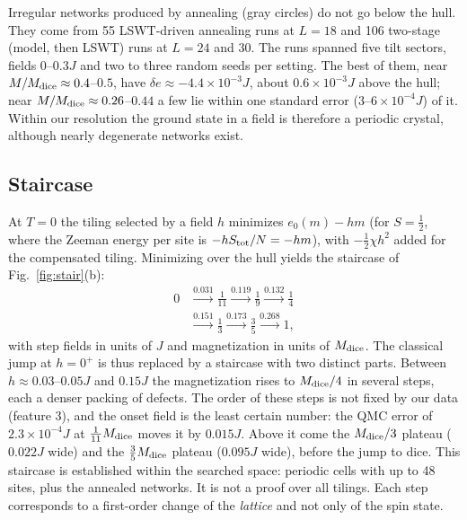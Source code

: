 \documentclass[prb,twocolumn,amsmath,amssymb,floatfix]{revtex4-2}
\newcommand{\Md}{M_{\rm dice}}
\begin{document}
Irregular networks produced by annealing (gray circles) do not go below the hull. They come from 55 LSWT-driven annealing runs at $L=18$ and 106 two-stage (model, then LSWT) runs at $L=24$ and $30$. The runs spanned five tilt sectors, fields $0$--$0.3J$ and two to three random seeds per setting. The best of them, near $M/\Md\approx0.4$--$0.5$, have $\delta e\approx-4.4\times10^{-3}J$, about $0.6\times10^{-3}J$ above the hull; near $M/\Md\approx0.26$--$0.44$ a few lie within one standard error ($3$--$6\times10^{-4}J$) of it. Within our resolution the ground state in a field is therefore a periodic crystal, although nearly degenerate networks exist.

\subsection{Staircase}

At $T=0$ the tiling selected by a field $h$ minimizes $e_0(m)-hm$ (for $S=\frac12$, where the Zeeman energy per site is $-hS_{\rm tot}/N=-hm$), with $-\frac12\chi h^2$ added for the compensated tiling. Minimizing over the hull yields the staircase of Fig.~\ref{fig:stair}(b):
\begin{align*}
0&\xrightarrow{0.031}\tfrac1{11}\xrightarrow{0.119}\tfrac19\xrightarrow{0.132}\tfrac14\\
&\xrightarrow{0.151}\tfrac13\xrightarrow{0.173}\tfrac35\xrightarrow{0.268}1,
\end{align*}
with step fields in units of $J$ and magnetization in units of $\Md$. The classical jump at $h=0^+$ is thus replaced by a staircase with two distinct parts. Between $h\approx0.03$--$0.05J$ and $0.15J$ the magnetization rises to $\Md/4$ in several steps, each a denser packing of defects. The order of these steps is not fixed by our data (feature 3), and the onset field is the least certain number: the QMC error of $2.3\times10^{-4}J$ at $\frac1{11}\Md$ moves it by $0.015J$. Above it come the $\Md/3$ plateau ($0.022J$ wide) and the $\frac35\Md$ plateau ($0.095J$ wide), before the jump to dice. This staircase is established within the searched space: periodic cells with up to 48 sites, plus the annealed networks. It is not a proof over all tilings. Each step corresponds to a first-order change of the \emph{lattice} and not only of the spin state.
\end{document}
